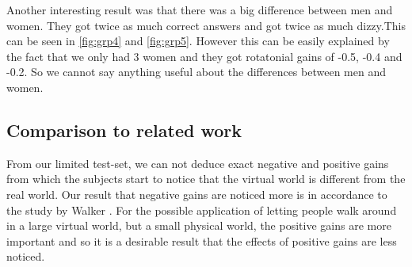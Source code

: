 Another interesting result was that there was a big difference between men and women. They got twice as much correct answers and got twice as much dizzy.This can be seen in \ref{fig:grp4} and \ref{fig:grp5}. However this can be easily explained by the fact that we only had 3 women and they got rotatonial gains of -0.5, -0.4 and -0.2. So we cannot say anything useful about the differences between men and women. 

\subsection{Comparison to related work}
From our limited test-set, we can not deduce exact negative and positive gains from which the subjects start to notice that the virtual world is different from the real world.
Our result that negative gains are noticed more is in accordance to the study by Walker \cite{jwalker}.
For the possible application of letting people walk around in a large virtual world, but a small physical world, the positive gains are more important and so it is a desirable result that the effects of positive gains are less noticed.
